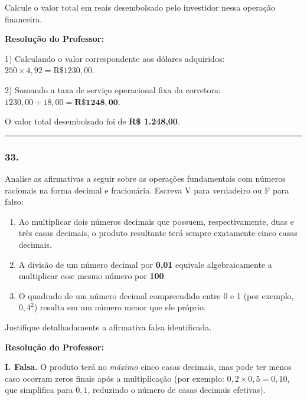 \begin{multicols*}{2}
Calcule o valor total em reais desembolsado pelo investidor nessa operação financeira.

\ifgabarito
    \begin{tcolorbox}[colback=CorTitUm!5, colframe=CorTitUm, boxrule=1pt, arc=4pt, left=6pt, right=6pt, top=6pt, bottom=6pt]
    \small\textbf{\textcolor{CorTitUm}{Resolução do Professor:}}\par\vspace{0.1cm}
    \color{CinzaEscuro}
    1) Calculando o valor correspondente aos dólares adquiridos:
    $250 \times 4,92 = \text{R\$ } 1230,00$.
    
    2) Somando a taxa de serviço operacional fixa da corretora:
    $1230,00 + 18,00 = \mathbf{\text{R\$ } 1248,00}$.
    
    O valor total desembolsado foi de \textbf{R\$ 1.248,00}.
    \end{tcolorbox}
\fi

\par\vspace{\espacoQuestao}

\noindent\textcolor{CorLinha}{\rule{\linewidth}{0.5pt}} 
\par\vspace{\espacoPreQuestao}
\subsubsection*{33.} Analise as afirmativas a seguir sobre as operações fundamentais com números racionais na forma decimal e fracionária. Escreva V para verdadeiro ou F para falso:
\begin{enumerate}[label=\Roman*., itemsep=\espacoAlt]
    \item Ao multiplicar dois números decimais que possuem, respectivamente, duas e três casas decimais, o produto resultante terá sempre exatamente cinco casas decimais.
    \item A divisão de um número decimal por \textbf{0,01} equivale algebraicamente a multiplicar esse mesmo número por \textbf{100}.
    \item O quadrado de um número decimal compreendido entre 0 e 1 (por exemplo, $0,4^2$) resulta em um número menor que ele próprio.
\end{enumerate}
Justifique detalhadamente a afirmativa falsa identificada.

\ifgabarito
    \begin{tcolorbox}[colback=CorTitUm!5, colframe=CorTitUm, boxrule=1pt, arc=4pt, left=6pt, right=6pt, top=6pt, bottom=6pt]
    \small\textbf{\textcolor{CorTitUm}{Resolução do Professor:}}\par\vspace{0.1cm}
    \color{CinzaEscuro}
    \textbf{I. Falsa.} O produto terá no \textit{máximo} cinco casas decimais, mas pode ter menos caso ocorram zeros finais após a multiplicação (por exemplo: $0,2 \times 0,5 = 0,10$, que simplifica para $0,1$, reduzindo o número de casas decimais efetivas).
    

\end{tcolorbox}
\end{multicols*}

